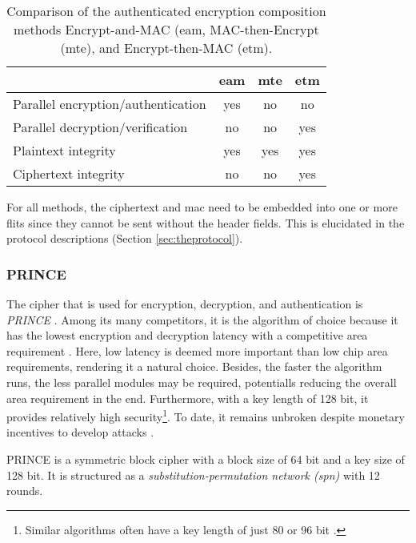 \begin{table}
    \centering
    \begin{tabulary}{\textwidth}{L|CCC}
        & \gls{eam} & \gls{mte} & \gls{etm} \\\hline
        Parallel encryption/authentication & yes & no & no \\
        Parallel decryption/verification & no & no & yes \\
        Plaintext integrity & yes & yes & yes \\
        Ciphertext integrity & no & no & yes \\ %
    \end{tabulary}
    \caption[Comparison of authenticated encryption composition methods]{Comparison of the authenticated encryption composition methods
    Encrypt-and-MAC (\gls{eam}, MAC-then-Encrypt (\gls{mte}), and Encrypt-then-MAC (\gls{etm}).}
    \label{tab:compositionmethods}
\end{table}

For all methods, the ciphertext and \gls{mac} need to be embedded into one or more flits since they cannot be sent without the header fields. This is
elucidated in the protocol descriptions (Section \ref{sec:theprotocol}).

\subsubsection{PRINCE}\label{subsubsec:prince}
The cipher that is used for encryption, decryption, and authentication is \textit{PRINCE} \cite{borghoff12prince}. Among its many competitors, it is
the algorithm of choice because it has the lowest encryption and decryption latency with a competitive area requirement
\cite{harttung17lightweightcrypto}. Here, low latency is deemed more important than low chip area requirements, rendering it a natural choice. Besides, the
faster the algorithm runs, the less parallel modules may be required, potentialls reducing the overall area requirement in the end. Furthermore, with a
key length of 128 bit, it provides relatively high security\footnote{Similar algorithms often have a key length of just 80 or 96 bit
\cite[5]{harttung17lightweightcrypto}.}. To date, it remains unbroken despite monetary incentives to develop attacks \cite{princechallenge}.

PRINCE is a symmetric block cipher with a block size of 64 bit and a key size of 128 bit. It is structured as a \textit{substitution-permutation
network (\gls{spn})} with 12 rounds.

